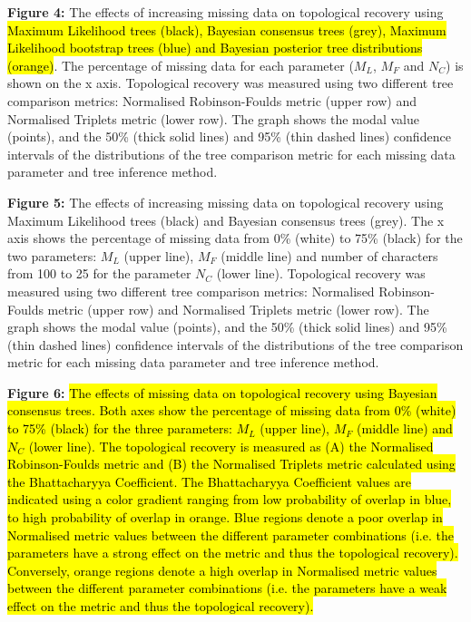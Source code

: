 \documentclass[12pt,letterpaper]{article}
\begin{document}
\bigskip
\noindent
\textbf{Figure 4:} The effects of increasing missing data on topological recovery using \hl{Maximum Likelihood trees (black), Bayesian consensus trees (grey), Maximum Likelihood bootstrap trees (blue) and Bayesian posterior tree distributions (orange)}. The percentage of missing data for each parameter ($M_{L}$, $M_{F}$ and $N_{C}$) is shown on the x axis. Topological recovery was measured using two different tree comparison metrics: Normalised Robinson-Foulds metric (upper row) and Normalised Triplets metric (lower row). The graph shows the modal value (points), and the 50\% (thick solid lines) and 95\% (thin dashed lines) confidence intervals of the distributions of the tree comparison metric for each missing data parameter and tree inference method.


\bigskip
\noindent
\textbf{Figure 5:} The effects of increasing missing data on topological recovery using Maximum Likelihood trees (black) and Bayesian consensus trees (grey). The x axis shows the percentage of missing data from 0\% (white) to 75\% (black) for the two parameters: $M_{L}$ (upper line), $M_{F}$ (middle line) and number of characters from 100 to 25 for the parameter $N_{C}$ (lower line). Topological recovery was measured using two different tree comparison metrics: Normalised Robinson-Foulds metric (upper row) and Normalised Triplets metric (lower row). The graph shows the modal value (points), and the 50\% (thick solid lines) and 95\% (thin dashed lines) confidence intervals of the distributions of the tree comparison metric for each missing data parameter and tree inference method.

\bigskip
\noindent
\textbf{Figure 6:} \hl{The effects of missing data on topological recovery using Bayesian consensus trees. Both axes show the percentage of missing data from 0\% (white) to 75\% (black) for the three parameters: $M_{L}$ (upper line), $M_{F}$ (middle line) and $N_{C}$ (lower line). The topological recovery is measured as (A) the Normalised Robinson-Foulds metric and (B) the Normalised Triplets metric calculated using the Bhattacharyya Coefficient. The Bhattacharyya Coefficient values are indicated using a color gradient ranging from low probability of overlap in blue, to high probability of overlap in orange. Blue regions denote a poor overlap in Normalised metric values between the different parameter combinations (i.e. the parameters have a strong effect on the metric and thus the topological recovery). Conversely, orange regions denote a high overlap in Normalised metric values between the different parameter combinations (i.e. the parameters have a weak effect on the metric and thus the topological recovery).}
\end{document}
